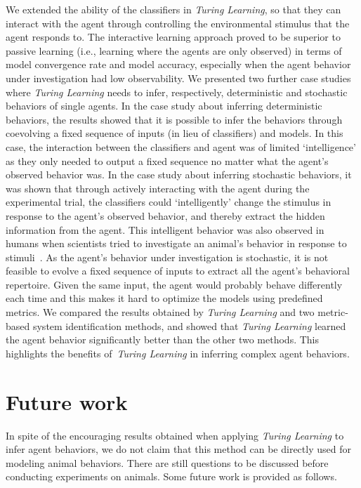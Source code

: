 We extended the ability of the classifiers in \textit{Turing Learning}, so that they can interact with the agent through controlling the environmental stimulus that the agent responds to. The interactive learning approach proved to be superior to passive learning (i.e., learning where the agents are only observed) in terms of model convergence rate and model accuracy, especially when the agent behavior under investigation had low observability. We presented two further case studies where \textit{Turing Learning} needs to infer, respectively, deterministic and stochastic behaviors of single agents. In the case study about inferring deterministic behaviors, the results showed that it is possible to infer the behaviors through coevolving a fixed sequence of inputs (in lieu of classifiers) and models. In this case, the interaction between the classifiers and agent was of limited `intelligence' as they only needed to output a fixed sequence no matter what the agent's observed behavior was. In the case study about inferring stochastic behaviors, it was shown that through actively interacting with the agent during the experimental trial, the classifiers could `intelligently' change the stimulus in response to the agent's observed behavior, and thereby extract the hidden information from the agent. This intelligent behavior was also observed in humans when scientists tried to investigate an animal's behavior in response to stimuli~\cite{Emily_2012}. As the agent's behavior under investigation is stochastic, it is not feasible to evolve a fixed sequence of inputs to extract all the agent's behavioral repertoire. Given the same input, the agent would probably behave differently each time and this makes it hard to optimize the models using predefined metrics. We compared the results obtained by \textit{Turing Learning} and two metric-based system identification methods, and showed that \textit{Turing Learning} learned the agent behavior significantly better than the other two methods. This highlights the benefits of~\textit{Turing Learning} in inferring complex agent behaviors.

\section{Future work}

In spite of the encouraging results obtained when applying \textit{Turing Learning} to infer agent behaviors, we do not claim that this method can be directly used for modeling animal behaviors. There are still questions to be discussed before conducting experiments on animals. Some future work is provided as follows.

